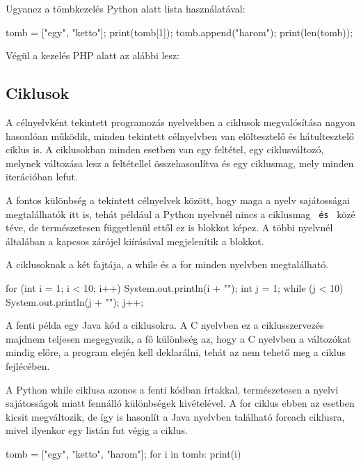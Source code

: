 Ugyanez a tömbkezelés Python alatt lista használatával:
\begin{cpp}
	tomb = ["egy", "ketto"];
	print(tomb[1]);
	tomb.append("harom");
	print(len(tomb));
\end{cpp}


Végül a kezelés PHP alatt az alábbi lesz:


\subsection{Ciklusok}

A célnyelvként tekintett programozás nyelvekben a ciklusok megvalósítása nagyon hasonlóan működik, minden tekintett célnyelvben van elöltesztelő és hátultesztelő ciklus is. A ciklusokban minden esetben van egy feltétel, egy ciklusváltozó, melynek változása lesz a feltétellel összehasonlítva és egy ciklusmag, mely minden iterációban lefut.

A fontos különbség a tekintett célnyelvek között, hogy maga a nyelv sajátosságai megtalálhatók itt is, tehát például a Python nyelvnél nincs a ciklusmag \texttt{{} és \texttt{}} közé téve, de természetesen függetlenül ettől ez is blokkot képez. A többi nyelvnél általában a kapcsos zárójel kiírásával megjelenítik a blokkot.

A ciklusoknak a két fajtája, a while és a for minden nyelvben megtalálható.
\begin{cpp}
	for (int i = 1; i < 10; i++) {
		System.out.println(i + "\n");
	}
	int j = 1;
	while (j < 10) {
		System.out.println(j + "\n");
		j++;
	}
\end{cpp}
A fenti példa egy Java kód a ciklusokra. A C nyelvben ez a ciklusszervezés majdnem teljesen megegyezik, a fő különbség az, hogy a C nyelvben a változókat mindig előre, a program elején kell deklarálni, tehát az nem tehető meg a ciklus fejlécében.

A Python while ciklusa azonos a fenti kódban írtakkal, természetesen a nyelvi sajátosságok miatt fennálló különbségek kivételével. A for ciklus ebben az esetben kicsit megváltozik, de így is hasonlít a Java nyelvben található foreach ciklusra, mivel ilyenkor egy listán fut végig a ciklus.
\begin{cpp}
	tomb = ["egy", "ketto", "harom"];
	for i in tomb:
		print(i)
\end{cpp}

